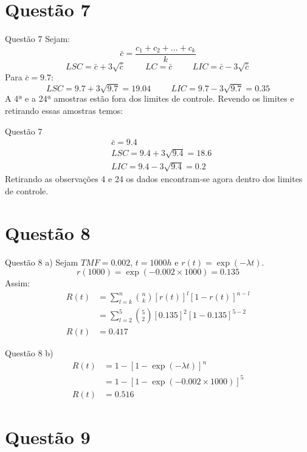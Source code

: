 \documentclass[fleqn]{beamer}\usepackage[]{graphicx}\usepackage[]{color}
\begin{document}
	\section{Questão 7}
		\begin{frame}{Questão 7}
			Sejam:
			$$\bar{c} = \frac{c_{1} + c_{2} + \dots + c_{k}}{k}$$
			$$LSC = \bar{c} + 3\sqrt{\bar{c}} \hspace{1cm} LC = \bar{c} \hspace{1cm} LIC = \bar{c} - 3\sqrt{\bar{c}}$$
			Para $\bar{c} = 9.7$:
			$$LSC = 9.7 + 3\sqrt{9.7} = 19.04 \hspace{1cm} LIC = 9.7 - 3\sqrt{9.7} = 0.35$$
			A 4ª e a 24ª amostras estão fora dos limites de controle.  Revendo os limites e retirando essas amostras temos:
		\end{frame}
		\begin{frame}{Questão 7}
			\begin{align*}
				&\bar{c} = 9.4\\
				&LSC = 9.4 + 3\sqrt{9.4} = 18.6\\
				&LIC = 9.4 - 3\sqrt{9.4} = 0.2 
			\end{align*}
			Retirando as observações 4 e 24 os dados encontram-se agora dentro dos limites de controle.
		\end{frame}
	\section{Questão 8}
		\begin{frame}{Questão 8}
			a)  Sejam $TMF = 0.002$, $t = 1000h$ e $r(t) = \exp(-\lambda t)$.
			$$r(1000) = \exp(-0.002\times1000) = 0.135$$
			Assim:
			\begin{align*}
				R(t) &= \sum_{l = k}^{n} \binom{n}{k} [r(t)] ^{l} [1-r(t)] ^{n-l}\\
					&= \sum_{l = 2}^{5} \binom{5}{2} [0.135] ^{2} [1-0.135] ^{5-2}\\
				R(t) &=  0.417
			\end{align*}
		\end{frame}
		\begin{frame}{Questão 8}
			b)\begin{align*}
					R(t) &= 1 - [1 - \exp(-\lambda t)]^{n}\\
						&= 1 - [1 - \exp(-0.002\times1000)]^{5}\\
					R(t) &= 0.516
			\end{align*}
		\end{frame}
	\section{Questão 9}
\end{document}
